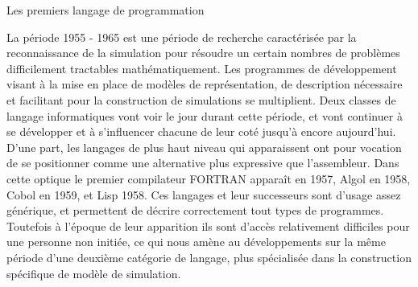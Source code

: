 

\begin{framewithtitle}{ Les premiers langage de programmation }

La période 1955 - 1965 est une période de recherche caractérisée par la reconnaissance de la simulation pour résoudre un certain nombres de problèmes difficilement tractables mathématiquement.\autocite{Nance1993, Ackoff1961} Les programmes de développement visant à la mise en place de modèles de représentation, de description nécessaire et facilitant pour la construction de simulations se multiplient. Deux classes de langage informatiques vont voir le jour durant cette période, et vont continuer à se développer et à s'influencer chacune de leur coté jusqu'à encore aujourd'hui. D'une part, les langages de plus haut niveau qui apparaissent ont pour vocation de se positionner comme une alternative plus expressive que l'assembleur. Dans cette optique le premier compilateur FORTRAN apparaît en 1957,  Algol en 1958, Cobol en 1959, et Lisp 1958. Ces langages et leur successeurs sont d'usage assez générique, et permettent de décrire correctement tout types de programmes. Toutefois à l'époque de leur apparition ils sont d'accès relativement difficiles pour une personne non initiée, ce qui nous amène au développements sur la même période d'une deuxième catégorie de langage, plus spécialisée dans la construction spécifique de modèle de simulation. \autocite[239]{Naylor1966}


\end{framewithtitle}
